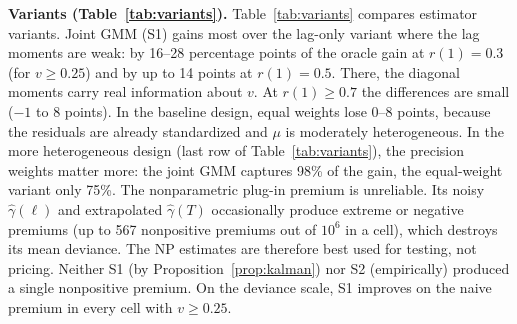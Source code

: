 \documentclass[mathematics,article,submit,moreauthors]{Definitions/mdpi}
\begin{document}
\textbf{Variants (Table~\ref{tab:variants}).} Table~\ref{tab:variants} compares estimator variants. Joint GMM (S1) gains most over the lag-only variant where the lag moments are weak: by 16--28 percentage points of the oracle gain at $r(1)=0.3$ (for $v\ge0.25$) and by up to 14 points at $r(1)=0.5$. There, the diagonal moments carry real information about $v$. At $r(1)\ge0.7$ the differences are small ($-1$ to $8$ points). In the baseline design, equal weights lose 0--8 points, because the residuals are already standardized and $\mu$ is moderately heterogeneous. In the more heterogeneous design (last row of Table~\ref{tab:variants}), the precision weights matter more: the joint GMM captures 98\% of the gain, the equal-weight variant only 75\%. The nonparametric plug-in premium is unreliable. Its noisy $\hat\gamma(\ell)$ and extrapolated $\hat\gamma(T)$ occasionally produce extreme or negative premiums (up to 567 nonpositive premiums out of $10^6$ in a cell), which destroys its mean deviance. The NP estimates are therefore best used for testing, not pricing. Neither S1 (by Proposition~\ref{prop:kalman}) nor S2 (empirically) produced a single nonpositive premium. On the deviance scale, S1 improves on the naive premium in every cell with $v\ge0.25$.
\end{document}
